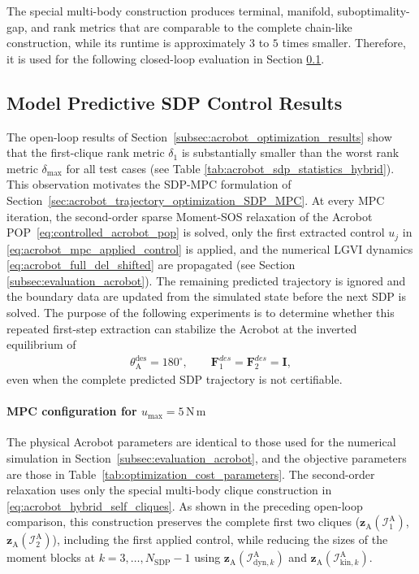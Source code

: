 The special multi-body construction produces terminal, manifold,
suboptimality-gap, and rank metrics that are comparable to the complete
chain-like construction, while its runtime is approximately $3$ to $5$
times smaller. Therefore, it is used for the following closed-loop evaluation
in Section \ref{subsec:acrobot_sdp_mpc_results}.



\subsection{Model Predictive SDP Control Results}
\label{subsec:acrobot_sdp_mpc_results}

The open-loop results of
Section~\ref{subsec:acrobot_optimization_results} show that the first-clique
rank metric $\delta_1$ is substantially smaller than the worst rank metric
$\delta_{\max}$ for all test cases (see Table \ref{tab:acrobot_sdp_statistics_hybrid}).
This observation motivates the SDP-MPC formulation of
Section~\ref{sec:acrobot_trajectory_optimization_SDP_MPC}. At every MPC
iteration, the second-order sparse Moment-SOS relaxation of the Acrobot
POP~\eqref{eq:controlled_acrobot_pop} is solved, only the first extracted control
$u_j$ in \eqref{eq:acrobot_mpc_applied_control} is applied, and the numerical
LGVI dynamics \eqref{eq:acrobot_full_del_shifted} 
are propagated (see Section \ref{subsec:evaluation_acrobot}).
The remaining predicted trajectory is ignored and the boundary data are
updated from the simulated state before the next SDP is solved. The purpose of
the following experiments is to determine whether this repeated first-step
extraction can stabilize the Acrobot at the inverted equilibrium of 
\begin{align}\label{eq:acrobot_stabilization_target}
    \theta_{\mathrm A}^{\mathrm{des}} = 180^\circ,
    \qquad
    \bm{F}^{des}_1=\bm{F}^{des}_2=\bm{I},
\end{align}
even when the
complete predicted SDP trajectory is not certifiable.

\paragraph{MPC configuration for $u_{\max}=5\,\mathrm{N\,m}$}
The physical Acrobot parameters are identical to those used for the numerical
simulation in Section~\ref{subsec:evaluation_acrobot}, and the objective
parameters are those in Table~\ref{tab:optimization_cost_parameters}. The
second-order relaxation uses only the special multi-body clique
construction in \eqref{eq:acrobot_hybrid_self_cliques}. As shown in the
preceding open-loop comparison, this construction preserves the complete first
two cliques (\(\bm{z}_{\mathrm{A}}(\mathcal I_1^{\mathrm{A}})\),
\(\bm{z}_{\mathrm{A}}(\mathcal I_2^{\mathrm{A}})\)),
including the first applied control, while reducing the sizes of
the moment blocks at $k=3,\dots,N_{\mathrm{SDP}}-1$ using
\(\bm{z}_{\mathrm{A}}(\mathcal I_{\mathrm{dyn},k}^{\mathrm{A}})\) and
\(\bm{z}_{\mathrm{A}}(\mathcal I_{\mathrm{kin},k}^{\mathrm{A}})\).

